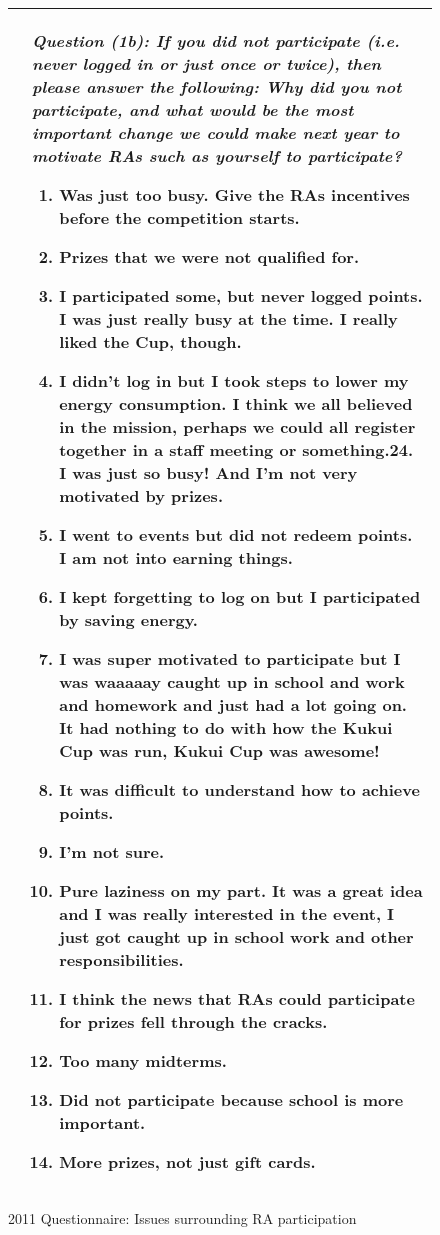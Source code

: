 \documentclass[]{article}
\begin{document}
\begin{figure*}[t]
\begin{tabular}{|l|l|}
&

\small  \begin{minipage}[t]{3.25in}
{\em Question (1b): If you did not participate (i.e. never logged in or just once or twice), then please answer the 
following:  Why did you not participate, and what would be the most important change we could make next year to 
motivate RAs such as yourself to participate? }
\begin{enumerate}
\item Was just too busy.  Give the RAs incentives before the competition starts.
\item Prizes that we were not qualified for.
\item I participated some, but never logged points.  I was just really busy at the time.  I really liked the Cup, 
though.
\item I didn't log in but I took steps to lower my energy consumption.   I think we all believed in the mission, 
perhaps we could all register together in a staff meeting or something.24. I was just so busy!   And I'm not very motivated by prizes. 
\item I went to events but did not redeem points.  I am not into earning things. 
\item I kept forgetting to log on but I participated by saving energy.
\item I was super motivated to participate but I was waaaaay caught up in school and work and homework and 
just had a lot going on.   It had nothing to do with how the Kukui Cup was run, Kukui Cup was awesome!
\item It was difficult to understand how to achieve points. 
\item I'm not sure. 
\item Pure laziness on my part.  It was a great idea and I was really interested in the event, I just got caught up 
in school work and other responsibilities.
\item I think the news that RAs could participate for prizes fell through the cracks. 
\item Too many midterms.  
\item Did not participate because school is more important.  
\item More prizes, not just gift cards.
\end{enumerate}
\end{minipage}  \normalsize
\\
\hline
\end{tabular}
\caption{2011 Questionnaire: Issues surrounding RA participation}
\label{fig:ra-participation-2011}
\end{figure*}
\end{document}
